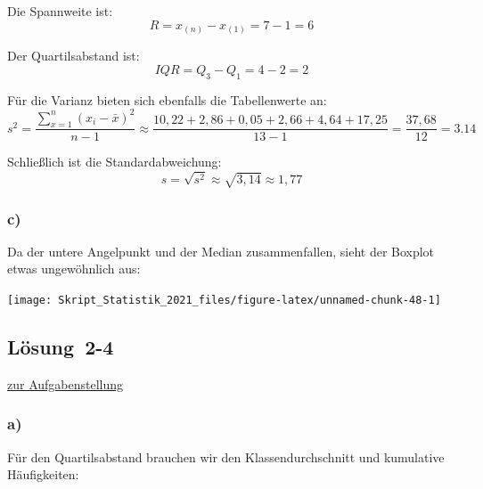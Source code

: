\documentclass[
  11pt,
  ngerman,
  a4paper,
]{report}
\begin{document}
Die Spannweite ist: \[R=x_{(n)}-x_{(1)}=7-1=6\]

Der Quartilsabstand ist: \[\mathit{IQR}=Q_3-Q_1=4-2=2\]

Für die Varianz bieten sich ebenfalls die Tabellenwerte an: \[s^2=\frac{\sum\limits_{x=1}^n(x_i-\bar{x})^2}{n-1}\approx\frac{10,22+ 2,86+ 0,05+ 2,66+ 4,64+17,25}{13-1}=\frac{37,68}{12}=3.14\]

Schließlich ist die Standardabweichung: \[s=\sqrt{s^2}\approx\sqrt{3,14}\approx1,77\]

\hypertarget{c-4}{%
\subsubsection{c)}\label{c-4}}

Da der untere Angelpunkt und der Median zusammenfallen, sieht der Boxplot etwas ungewöhnlich aus:

\begin{center}\texttt{[image: Skript\_Statistik\_2021\_files/figure-latex/unnamed-chunk-48-1]} \end{center}

\hypertarget{loesung-2-4}{%
\subsection{Lösung~2-4}\label{loesung-2-4}}

\protect\hyperlink{aufgabe-2-4}{zur Aufgabenstellung}

\hypertarget{a-5}{%
\subsubsection{a)}\label{a-5}}

Für den Quartilsabstand brauchen wir den Klassendurchschnitt und kumulative Häufigkeiten:
\end{document}
